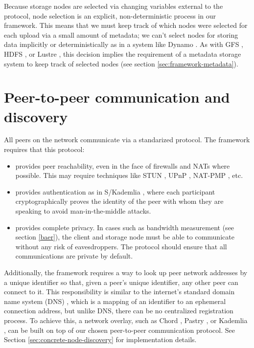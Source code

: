 \documentclass[8pt,fleqn,openany]{book}
\begin{document}
Because storage
nodes are selected via changing variables external to the protocol, node
selection is an explicit, non-deterministic process in our framework. This means
that we must keep track of which nodes were selected for each upload via a
small amount of metadata; we can't select nodes for storing data implicitly or
deterministically as in a system like Dynamo \cite{dynamo}. As with
GFS \cite{gfs}, HDFS \cite{hdfs}, or Lustre \cite{lustre}, this decision
implies the requirement of a metadata storage system to keep track
of selected nodes (see section \ref{sec:framework-metadata}).

\section{Peer-to-peer communication and discovery}

All peers on the network communicate via a standarized protocol. The
framework requires that this protocol:

\begin{itemize}
\item provides peer reachability, even in the face of firewalls
and NATs where possible.
This may require techniques like STUN \cite{stun}, UPnP \cite{upnp},
NAT-PMP \cite{natpmp}, etc.
\item provides authentication as in S/Kademlia \cite{skad},
where each participant cryptographically
proves the identity of the peer with whom they are speaking to avoid
man-in-the-middle attacks.
\item provides complete privacy. In cases such as bandwidth measurement
(see section \ref{baer}), the client and storage node must be able
to communicate without any risk of eavesdroppers. The protocol should
ensure that all communications are private by default.
\end{itemize}

Additionally, the framework requires a way to look up peer network addresses
by a unique identifier so that, given a peer's unique identifier, any other
peer can connect to it. This responsibility is similar to the internet's
standard domain name system (DNS) \cite{dns},
which is a mapping of an identifier to an
ephemeral connection address, but unlike DNS, there can be no centralized
registration process.
To achieve this, a network overlay, such as Chord \cite{chord},
Pastry \cite{pastry}, or Kademlia \cite{kad}, can be
built on top of our chosen peer-to-peer communication protocol.
See Section \ref{sec:concrete-node-discovery} for
implementation details.
\end{document}
